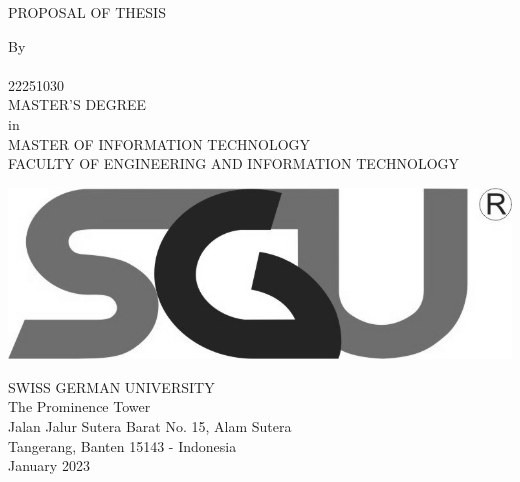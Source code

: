 
\begin{titlepage}
\begin{center}

\begin{spacing}{2}
    PROPOSAL OF THESIS
	\textbf{ \TITLE} \\[0.7in]
\end{spacing}

\begin{spacing}{1.5}
	By \\ \AUTHOR \\ 22251030 \\[0.5in]

    MASTER'S DEGREE \\ in \\ MASTER OF INFORMATION TECHNOLOGY \\ FACULTY OF ENGINEERING AND INFORMATION TECHNOLOGY \\[0.7in]
\end{spacing}
	  
\vfill
\centering \includegraphics{images/sgu}  \\%
\vfill

\hfil
\begin{spacing}{1}
	SWISS GERMAN UNIVERSITY \\
    The Prominence Tower \\
    Jalan Jalur Sutera Barat No. 15, Alam Sutera \\
    Tangerang, Banten 15143 - Indonesia \\[0.5in]
    
    January 2023
\end{spacing}


\end{center}
\end{titlepage}

